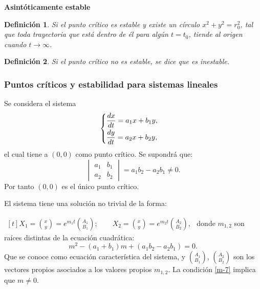 \documentclass[a5paper,doc,10pt,noapacite]{apa6}
\newtheorem{definicion}{Definición}
\newcommand{\neodefi}[1]{%
	\vspace{1\baselineskip}
	\textbf{\small#1} \newline
}
\begin{document}
{{\neodefi{Asintóticamente estable}

\begin{definicion}
	Si el punto crítico es estable y existe un círculo \(x^2+y^2=r_0^2\), tal que toda trayectoria que está dentro de él para algún \(t=t_0\), tiende al origen cuando \(t\to\infty\).
\end{definicion}


\begin{definicion}
	Si el punto crítico no es estable, se dice que es inestable.
\end{definicion}






\newpage

%
%
%
\subsubsection{Puntos críticos y estabilidad para sistemas lineales}
%
%
%

Se considera el sistema
\begin{equation}\label{m-6}
	\begin{cases}
		\dfrac{dx}{dt}=a_1 x + b_1 y,\vspace{0.3em}
		\\
		\dfrac{dy}{dt}=a_2 x + b_2 y,
	\end{cases}
\end{equation}
el cual tiene  a \((0,0)\) como punto crítico. Se supondrá que:
\begin{equation}\label{m-7}
	\begin{vmatrix}
		a_1	&	b_1	\\
		a_2	&	b_2
	\end{vmatrix}
	=	a_1b_2-a_2b_1\neq 0.
\end{equation}
Por tanto \((0,0)\) es el único punto crítico.

El sistema tiene una solución no trivial de la forma:
\vspace{0.5\baselineskip}
\begin{APAenumerate}
	\item \( \begin{aligned}[t]
	X_1 = \binom{x}{y}
		= e^{m_1 t } \binom{A_1}{B_1}
	;
	\qquad
	X_2 = \binom{x}{y}
		= e^{m_2 t } \binom{A_2}{B_2},
	\end{aligned}
	\)
	donde \(m_{1,2}\) son raíces distintas de la ecuación cuadrática: 
	\begin{equation}\label{m-8}
		m^2-(a_1+b_1)m+(a_1b_2-a_2b_1)=0.
	\end{equation}
	Que se conoce como ecuación característica del sistema, y \(\binom{A_1}{B_1}\), \(\binom{A_2}{B_2}\) son los vectores propios asociados a los valores propios \(m_{1,2}\). La condición \eqref{m-7} implica que \(m\neq 0\).
	

\end{APAenumerate}}}
\end{document}
